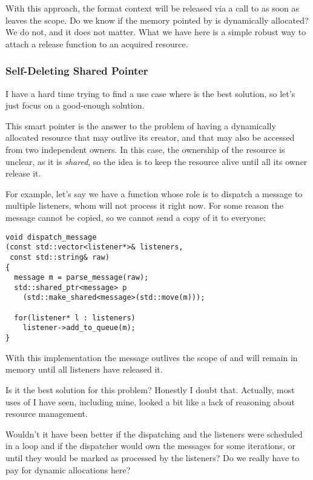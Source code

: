 With this approach, the format context will be released via a call to
 as soon as
 leaves the scope. Do we know if the memory
pointed by  is dynamically allocated? We
do not, and it does not matter. What we have here is a simple robust
way to attach a release function to an acquired resource.

\subsubsection{Self-Deleting Shared Pointer}

%
%
I have a hard time trying to find a use case where
 is the best solution, so let's just focus on a
good-enough solution.

This smart pointer is the answer to the problem of having a
dynamically allocated resource that may outlive its creator, and that
may also be accessed from two independent owners. In this case, the
ownership of the resource is unclear, as it is \emph{shared}, so the
idea is to keep the resource alive until all its owner release it.

For example, let's say we have a function whose role is to dispatch a
message to multiple listeners, whom will not process it right now. For
some reason the message cannot be copied, so we cannot send a copy of
it to everyone:

\begin{lstlisting}
void dispatch_message
(const std::vector<listener*>& listeners,
 const std::string& raw)
{
  message m = parse_message(raw);
  std::shared_ptr<message> p
    (std::make_shared<message>(std::move(m)));

  for(listener* l : listeners)
    listener->add_to_queue(m);
}
\end{lstlisting}

With this implementation the message outlives the scope of
 and will remain in memory until all
listeners have released it.

Is it the best solution for this problem? Honestly I doubt
that. Actually, most uses of  I have seen,
including mine, looked a bit like a lack of reasoning about resource
management.

Wouldn't it have been better if the dispatching and the listeners were
scheduled in a loop and if the dispatcher would own the messages for
some iterations, or until they would be marked as processed by the
listeners? Do we really have to pay for dynamic allocations here?

